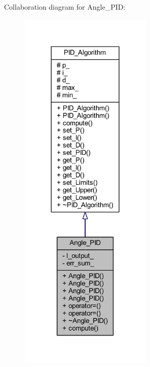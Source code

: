 Collaboration diagram for Angle\+\_\+\+P\+ID\+:
\nopagebreak
\begin{figure}[H]
\begin{center}
\leavevmode
\includegraphics[width=180pt]{class_angle___p_i_d__coll__graph}
\end{center}
\end{figure}
